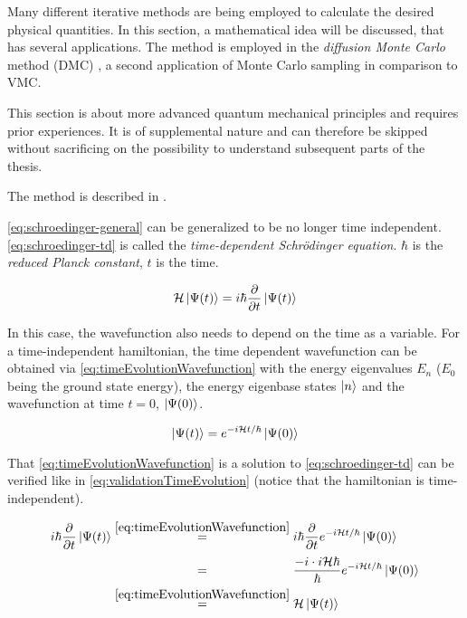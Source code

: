 Many different iterative methods are being employed to calculate the desired physical quantities.
In this section, a mathematical idea will be discussed, that has several applications.
The method is employed in the \emph{diffusion Monte Carlo} method (DMC) \cite{quantumMonteCarloSimulationsOfSolids}, a second application of Monte Carlo sampling in comparison to VMC.

This section is about more advanced quantum mechanical principles and requires prior experiences. It is of supplemental nature and can therefore be skipped without sacrificing on the possibility to understand subsequent parts of the thesis.

The method is described in \cite{imaginarySchroedingerEquation}.

\autoref{eq:schroedinger-general} can be generalized to be no longer time independent. 
\autoref{eq:schroedinger-td} is called the \emph{time-dependent Schrödinger equation}. $\hbar$ is the \emph{reduced Planck constant}, $t$ is the time.

\begin{equation}
    \label{eq:schroedinger-td}
    \mathcal{H} \ket{\Psi(t)} = i\hbar \frac{\partial }{\partial t} \ket{\Psi(t)}
\end{equation}

In this case, the wavefunction also needs to depend on the time as a variable.
For a time-independent hamiltonian, the time dependent wavefunction can be obtained via \autoref{eq:timeEvolutionWavefunction} \cite{schwablQM} with the energy eigenvalues $E_n$ ($E_0$ being the ground state energy), the energy eigenbase states $\ket{n}$ and the wavefunction at time $t=0$, $\ket{\Psi(0)}$.

\begin{equation}
    \label{eq:timeEvolutionWavefunction}
        \ket{\Psi(t)} = e^{-i\mathcal{H} t / \hbar} \ket{\Psi(0)}
\end{equation}

That \autoref{eq:timeEvolutionWavefunction} is a solution to \autoref{eq:schroedinger-td} can be verified like in \autoref{eq:validationTimeEvolution} (notice that the hamiltonian is time-independent).

\begin{equation}
    \label{eq:validationTimeEvolution}
    \begin{split}
        i\hbar \frac{\partial }{\partial t} \ket{\Psi(t)} &\stackrel{\ref{eq:timeEvolutionWavefunction}}{=} 
        i\hbar \frac{\partial }{\partial t}  e^{-i\hamiltonian t / \hbar} \ket{\Psi(0)}\\
        &\stackrel{\phantom{\ref{eq:timeEvolutionWavefunction}}}{=} \frac{-i\cdot i \hamiltonian \hbar}{\hbar} e^{-i\hamiltonian t / \hbar} \ket{\Psi(0)}\\
        &\stackrel{\ref{eq:timeEvolutionWavefunction}}{=} \hamiltonian \ket{\Psi(t)}
    \end{split}
\end{equation}

